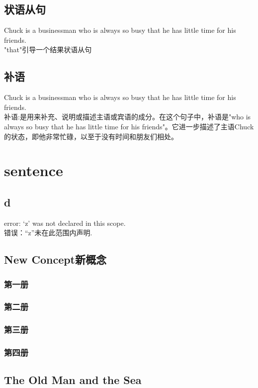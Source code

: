 \documentclass[12pt,twiside,a4paper]{ctexbook}
\numberwithin{chapter}{part}
\begin{document}
\section{状语从句}
Chuck is a businessman who is always so busy that he has little time for his friends. \\
"that"引导一个结果状语从句
\section{补语}
Chuck is a businessman who is always so busy that he has little time for his friends. \\
补语:是用来补充、说明或描述主语或宾语的成分。在这个句子中，补语是"who is always so busy that he has little time for his friends"。它进一步描述了主语Chuck的状态，即他非常忙碌，以至于没有时间和朋友们相处。

\chapter{sentence}
\section{d}
error: ‘z’ was not declared in this scope.\\
错误：“z”未在此范围内声明.

\section{New Concept新概念}
\subsection{第一册}
\subsection{第二册}
\subsection{第三册}
\subsection{第四册}
\section{The Old Man and the Sea}
\end{document}
